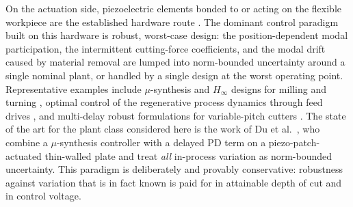 \documentclass[preprint,12pt]{elsarticle}
\newcommand{\hinf}{H_\infty}
\begin{document}
On the actuation side, piezoelectric elements bonded to or acting on the
flexible workpiece are the established hardware route
\cite{zhang2005milling,iorga2008review,zhang2019robust,wang2019timespace}.
The dominant control paradigm built on this hardware is robust,
worst-case design: the position-dependent modal participation, the
intermittent cutting-force coefficients, and the modal drift caused by
material removal are lumped into norm-bounded uncertainty around a single
nominal plant, or handled by a single design at the worst operating
point. Representative examples include $\mu$-synthesis and $\hinf$
designs for milling and turning
\cite{du2024robust,du2022modal,zhang2019robust,vandijk2012robust,
vandijk2015fixed,mizrachi2020robust,ruttanatri2021hinfinity,li2022coupling},
optimal control of the regenerative process dynamics through feed drives
\cite{dumanli2021active,dumanli2022active}, and multi-delay robust
formulations for variable-pitch cutters \cite{huang2018robust}. The
state of the art for the plant class considered here is the work of Du
et al.~\cite{du2024robust}, who combine a $\mu$-synthesis controller with
a delayed PD term on a piezo-patch-actuated thin-walled plate and treat
\emph{all} in-process variation as norm-bounded uncertainty. This
paradigm is deliberately and provably conservative: robustness against
variation that is in fact known is paid for in attainable depth of cut
and in control voltage.
\end{document}
